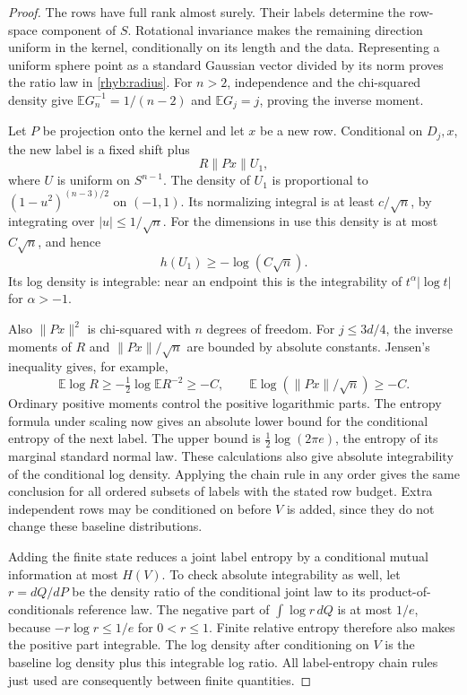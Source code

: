 \begin{proof}
The rows have full rank almost surely.  Their labels determine the
row-space component of \(S\).  Rotational invariance makes the remaining
direction uniform in the kernel, conditionally on its length and the
data.  Representing a uniform sphere point as a standard Gaussian vector
divided by its norm proves the ratio law in \eqref{rhyb:radius}.
For \(n>2\), independence and the chi-squared density give
\(\mathbb E G_n^{-1}=1/(n-2)\) and \(\mathbb E G_j=j\), proving the inverse
moment.

Let \(P\) be projection onto the kernel and let \(x\) be a new row.
Conditional on \(D_j,x\), the new label is a fixed shift plus
\[
 R\|Px\|U_1,
\]
where \(U\) is uniform on \(S^{n-1}\).  The density of \(U_1\) is
proportional to \((1-u^2)^{(n-3)/2}\) on \((-1,1)\).  Its normalizing
integral is at least \(c/\sqrt n\), by integrating over
\(|u|\le1/\sqrt n\).  For the dimensions in use this density is at most
\(C\sqrt n\), and hence
\[
 h(U_1)\ge-\log(C\sqrt n).
\]
Its log density is integrable: near an endpoint this is the
integrability of \(t^\alpha|\log t|\) for \(\alpha>-1\).

Also \(\|Px\|^2\) is chi-squared with \(n\) degrees of freedom.
For \(j\le3d/4\), the inverse moments of \(R\) and \(\|Px\|/\sqrt n\)
are bounded by absolute constants.  Jensen's inequality gives, for
example,
\[
 \mathbb E\log R\ge-\tfrac12\log\mathbb E R^{-2}\ge-C,
 \qquad
 \mathbb E\log(\|Px\|/\sqrt n)\ge-C.
\]
Ordinary positive moments control the positive logarithmic parts.
The entropy formula under scaling now gives an absolute lower bound for
the conditional entropy of the next label.  The upper bound is
\(\tfrac12\log(2\pi e)\), the entropy of its marginal standard normal
law.  These calculations also give absolute integrability of the
conditional log density.  Applying the chain rule in any order gives
the same conclusion for all ordered subsets of labels with the stated
row budget.  Extra independent rows may be conditioned on before \(V\)
is added, since they do not change these baseline distributions.

Adding the finite state reduces a joint label entropy by a conditional
mutual information at most \(H(V)\).  To check absolute integrability as
well, let \(r=dQ/dP\) be the density ratio of the conditional joint law
to its product-of-conditionals reference law.  The negative part of
\(\int\log r\,dQ\) is at most \(1/e\), because
\(-r\log r\le1/e\) for \(0<r\le1\).  Finite relative entropy therefore
also makes the positive part integrable.  The log density after
conditioning on \(V\) is the baseline log density plus this integrable
log ratio.  All label-entropy chain rules just used are consequently
between finite quantities.


\end{proof}
